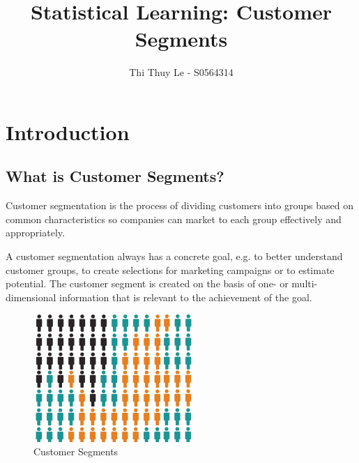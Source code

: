 \documentclass{article}
\title{Statistical Learning: Customer Segments}
\author{Thi Thuy Le - S0564314}
\begin{document}
\fontsize{13pt}{18pt}\selectfont
\maketitle

\tableofcontents
 \vspace{7cm}
\section{Introduction}

\subsection{What is Customer Segments?}


Customer segmentation is the process of dividing customers into groups based on common characteristics so companies can market to each group effectively and appropriately.

A customer segmentation always has a concrete goal, e.g. to better understand customer groups, to create selections for marketing campaigns or to estimate potential. The customer segment is created on the basis of one- or multi-dimensional information that is relevant to the achievement of the goal.

\begin{figure}[htp]
    \centering
    \includegraphics[width=6cm]{Customer.jpg}
    \caption{Customer Segments}
    \label{fig:Customer}
\end{figure}
\end{document}
